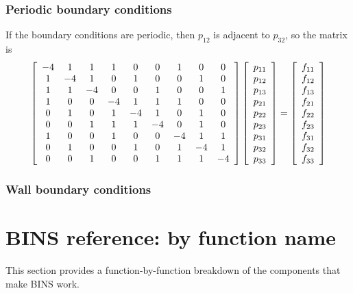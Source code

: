 \documentclass[12pt]{article}
\begin{document}
\subsubsection{Periodic boundary conditions}
If the boundary conditions are periodic, then $p_{12}$ is adjacent to $p_{32}$, so the matrix is
\[ \left[ \begin{array}{c c c c c c c c c} 
-4&1&1&1&0&0&1&0&0\\ 
1&-4&1&0&1&0&0&1&0\\ 
1&1&-4&0&0&1&0&0&1\\ 
1&0&0&-4&1&1&1&0&0\\ 
0&1&0&1&-4&1&0&1&0 \\ 
0&0&1&1&1&-4&0&1&0\\ 
1&0&0&1&0&0&-4&1&1\\ 
0&1&0&0&1&0&1&-4&1\\ 
0&0&1&0&0&1&1&1&-4\\ \end{array} \right] \left[ \begin{array}{c} p_{11}\\p_{12}\\p_{13}\\p_{21}\\p_{22}\\p_{23}\\p_{31}\\p_{32}\\p_{33}\\ \end{array}\right] = \left[ \begin{array}{c} f_{11}\\f_{12}\\f_{13}\\f_{21}\\f_{22}\\f_{23}\\f_{31}\\f_{32}\\f_{33}\\ \end{array}\right]
\]

\subsubsection{Wall boundary conditions}

\section{BINS reference: by function name}
This section provides a function-by-function breakdown of the components that make BINS work.
\end{document}
